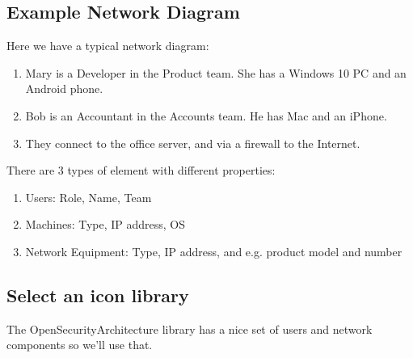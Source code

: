 \documentclass[letterpaper,10pt,english]{sphinxmanual}
\begin{document}
\subsection{Example Network Diagram}
\label{\detokenize{NetworkUsersMachines/NetworkUsersMachines:example-network-diagram}}
\begin{figure}[htbp]
\centering
\capstart

\caption{}\label{\detokenize{NetworkUsersMachines/NetworkUsersMachines:id15}}\end{figure}

Here we have a typical network diagram:
\begin{enumerate}
%
\item {} 
Mary is a Developer in the Product team. She has a Windows 10 PC and an Android phone.

\item {} 
Bob is an Accountant in the Accounts team. He has Mac and an iPhone.

\item {} 
They connect to the office server, and via a firewall to the Internet.

\end{enumerate}

There are 3 types of element with different properties:
\begin{enumerate}
%
\item {} 
Users: Role, Name, Team

\item {} 
Machines: Type, IP address, OS

\item {} 
Network Equipment: Type, IP address, and e.g. product model and number

\end{enumerate}


\subsection{Select an icon library}
\label{\detokenize{NetworkUsersMachines/NetworkUsersMachines:select-an-icon-library}}
The OpenSecurityArchitecture library has a nice set of users and network components so we’ll use that.
\end{document}
